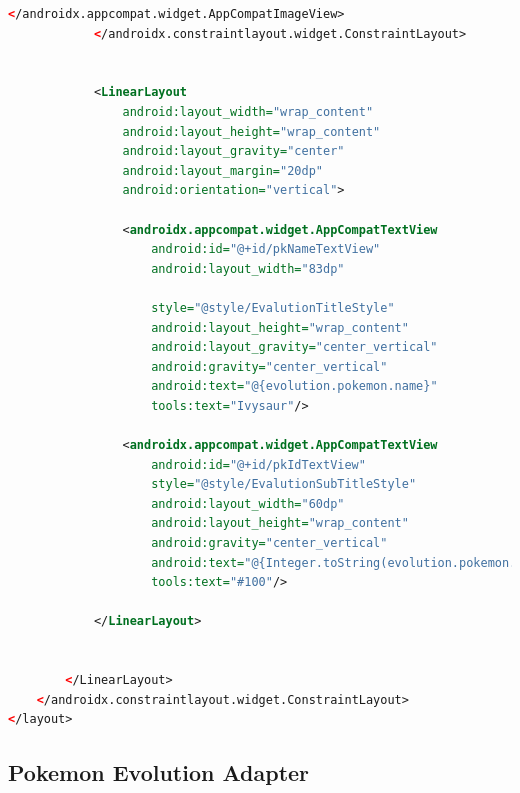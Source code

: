 \documentclass[a4paper, 12pt]{article}
\begin{document}
\begin{lstlisting}[caption={Pokemon Evolution Item Layout.}, label={layout:pk_evolution}, language=XML]
                </androidx.appcompat.widget.AppCompatImageView>
            </androidx.constraintlayout.widget.ConstraintLayout>


            <LinearLayout
                android:layout_width="wrap_content"
                android:layout_height="wrap_content"
                android:layout_gravity="center"
                android:layout_margin="20dp"
                android:orientation="vertical">

                <androidx.appcompat.widget.AppCompatTextView
                    android:id="@+id/pkNameTextView"
                    android:layout_width="83dp"

                    style="@style/EvalutionTitleStyle"
                    android:layout_height="wrap_content"
                    android:layout_gravity="center_vertical"
                    android:gravity="center_vertical"
                    android:text="@{evolution.pokemon.name}"
                    tools:text="Ivysaur"/>

                <androidx.appcompat.widget.AppCompatTextView
                    android:id="@+id/pkIdTextView"
                    style="@style/EvalutionSubTitleStyle"
                    android:layout_width="60dp"
                    android:layout_height="wrap_content"
                    android:gravity="center_vertical"
                    android:text="@{Integer.toString(evolution.pokemon.id)}"
                    tools:text="#100"/>

            </LinearLayout>


        </LinearLayout>
    </androidx.constraintlayout.widget.ConstraintLayout>
</layout>
\end{lstlisting}


\subsection{Pokemon Evolution Adapter}
\end{document}
